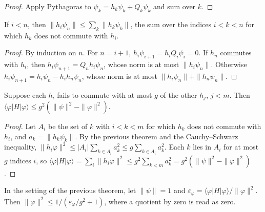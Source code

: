 \begin{proof}
    \leanok
    Apply Pythagoras to $\psi_k=h_k\psi_k+Q_k\psi_k$ and sum over $k$.
\end{proof}

\begin{theorem}
    \label{thm:detectability_one_term}
    \leanok
    If $i<n$, then $\|h_i\psi_n\|\le\sum_k\|h_k\psi_k\|$, the sum over the
    indices $i<k<n$ for which $h_k$ does not commute with $h_i$.
\end{theorem}

\begin{proof}
    \leanok
    By induction on $n$. For $n=i+1$, $h_i\psi_{i+1}=h_iQ_i\psi_i=0$. If
    $h_n$ commutes with $h_i$, then $h_i\psi_{n+1}=Q_nh_i\psi_n$, whose norm
    is at most $\|h_i\psi_n\|$. Otherwise
    $h_i\psi_{n+1}=h_i\psi_n-h_ih_n\psi_n$, whose norm is at most
    $\|h_i\psi_n\|+\|h_n\psi_n\|$.
\end{proof}

\begin{theorem}
    \label{thm:detectability_lemma}
    \leanok
    Suppose each $h_i$ fails to commute with at most $g$ of the other
    $h_j$, $j<m$. Then
    $\langle\varphi|H|\varphi\rangle\le g^2(\|\psi\|^2-\|\varphi\|^2)$.
\end{theorem}

\begin{proof}
    \leanok
    Let $A_i$ be the set of $k$ with $i<k<m$ for which $h_k$ does not
    commute with $h_i$, and $a_k=\|h_k\psi_k\|$. By the previous theorem
    and the Cauchy--Schwarz inequality,
    $\|h_i\varphi\|^2\le|A_i|\sum_{k\in A_i}a_k^2\le g\sum_{k\in A_i}a_k^2$.
    Each $k$ lies in $A_i$ for at most $g$ indices $i$, so
    $\langle\varphi|H|\varphi\rangle=\sum_i\|h_i\varphi\|^2
        \le g^2\sum_{k<m}a_k^2=g^2(\|\psi\|^2-\|\varphi\|^2)$.
\end{proof}

\begin{theorem}
    \label{thm:detectability_lemma_normalized}
    \leanok
    In the setting of the previous theorem, let $\|\psi\|=1$ and
    $\varepsilon_\varphi=\langle\varphi|H|\varphi\rangle/\|\varphi\|^2$.
    Then $\|\varphi\|^2\le1/(\varepsilon_\varphi/g^2+1)$, where a quotient
    by zero is read as zero.
\end{theorem}

